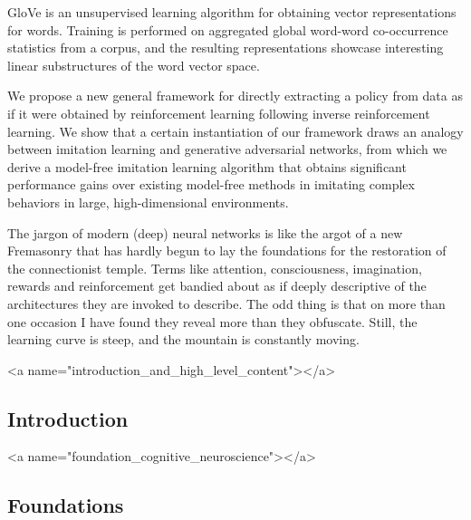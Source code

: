 

GloVe is an unsupervised learning algorithm for obtaining vector representations for words. Training is performed on aggregated global word-word co-occurrence statistics from a corpus, and the resulting representations showcase interesting linear substructures of the word vector space.


We propose a new general framework for directly extracting a policy from data as if it were obtained by reinforcement learning following inverse reinforcement learning. We show that a certain instantiation of our framework draws an analogy between imitation learning and generative adversarial networks, from which we derive a model-free imitation learning algorithm that obtains significant performance gains over existing model-free methods in imitating complex behaviors in large, high-dimensional environments.


The jargon of modern (deep) neural networks is like the argot of a new Fremasonry that has hardly begun to lay the foundations for the restoration of the connectionist temple. Terms like attention, consciousness, imagination, rewards and reinforcement get bandied about as if deeply descriptive of the architectures they are invoked to describe. The odd thing is that on more than one occasion I have found they reveal more than they obfuscate. Still, the learning curve is steep, and the mountain is constantly moving.


\rawhtml
<a name="introduction_and_high_level_content"></a>
\endrawhtml
\subsection*{Introduction}



\rawhtml
<a name="foundation_cognitive_neuroscience"></a>
\endrawhtml
\subsection*{Foundations}

